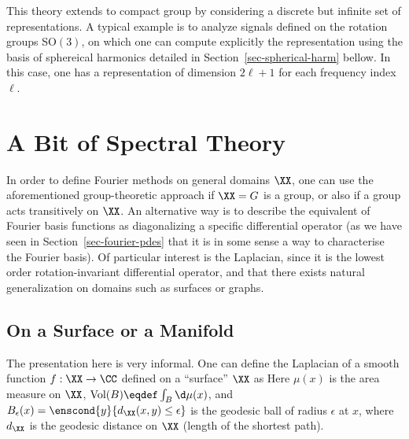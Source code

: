 This theory extends to compact group by considering a discrete but infinite set of representations. A typical example is to analyze signals defined on the rotation groups SO$(3)$, on which one can compute explicitly the representation using the basis of sphereical harmonics detailed in Section~\ref{sec-spherical-harm} bellow. In this case, one has a representation of dimension $2\ell+1$ for each frequency index $\ell$. 
 
%

\section{A Bit of Spectral Theory}

In order to define Fourier methods on general domains $\XX$, one can use the aforementioned group-theoretic approach if $\XX=G$ is a group, or also if a group acts transitively on $\XX$. An alternative way is to describe the equivalent of Fourier basis functions as diagonalizing a specific differential operator (as we have seen in Section~\ref{sec-fourier-pdes} that it is in some sense a way to characterise the Fourier basis). Of particular interest is the Laplacian, since it is the lowest order rotation-invariant differential operator, and that there exists natural generalization on domains such as surfaces or graphs.


\subsection{On a Surface or a Manifold}

The presentation here is very informal. One can define the Laplacian of a smooth function $f: \XX \rightarrow \CC$ defined on a ``surface'' $\XX$ as
Here $\mu(x)$ is the area measure on $\XX$, $\text{Vol}(B) \eqdef \int_B \d\mu(x)$, and $B_\epsilon(x) = \enscond{y}{d_\XX(x,y) \leq \epsilon}$ is the geodesic ball of radius $\epsilon$ at $x$, where $d_\XX$ is the geodesic distance on $\XX$ (length of the shortest path). 

